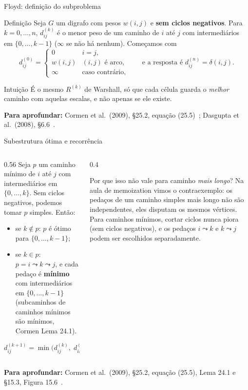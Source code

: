 \documentclass[aspectratio=169,xcolor=table]{beamer}
\newcommand{\fonte}[1]{%
  \vfill
  {\tiny\color{gray!55!black}\textbf{Para aprofundar:} #1\par}%
}
\begin{document}
\begin{frame}{Floyd: definição do subproblema}
  \begin{block}{Definição}
    \scriptsize Seja $G$ um digrafo com pesos $w(i,j)$ e \textbf{sem ciclos negativos}. Para
    $k = 0,\dots,n$, $d^{(k)}_{ij}$ é o menor peso de um caminho de $i$ até $j$ com
    intermediários em $\{0,\dots,k-1\}$ ($\infty$ se não há nenhum). Começamos com
    \[
      d^{(0)}_{ij} = \begin{cases} 0 & i = j,\\ w(i,j) & (i,j) \text{ é arco},\\
        \infty & \text{caso contrário},\end{cases}
      \qquad\text{e a resposta é } d^{(n)}_{ij} = \delta(i,j).
    \]
  \end{block}
  \begin{exampleblock}{Intuição}
    \scriptsize É o mesmo $R^{(k)}$ de Warshall, só que cada célula guarda o \emph{melhor}
    caminho com aquelas escalas, e não apenas se ele existe.
  \end{exampleblock}
  \fonte{Cormen et al.\ (2009), \S 25.2, equação (25.5)~\cite{cormen2009introduction};
    Dasgupta et al.\ (2008), \S 6.6~\cite{dasgupta2008algorithms}.}
\end{frame}

\begin{frame}{Subestrutura ótima e recorrência}
  \begin{columns}[c]
    \begin{column}{0.56\textwidth}
      \scriptsize Seja $p$ um caminho mínimo de $i$ até $j$ com intermediários em
      $\{0,\dots,k\}$. Sem ciclos negativos, podemos tomar $p$ simples. Então:
      \begin{itemize}\scriptsize
        \item se $k \notin p$: $p$ é ótimo para $\{0,\dots,k-1\}$;
        \item se $k \in p$: $p = i \leadsto k \leadsto j$, e cada pedaço é \textbf{mínimo}
              com intermediários em $\{0,\dots,k-1\}$ (subcaminhos de caminhos mínimos são
              mínimos, Cormen Lema 24.1).
      \end{itemize}
      \[
        d^{(k+1)}_{ij} = \min\bigl(d^{(k)}_{ij},\; d^{(k)}_{ik} + d^{(k)}_{kj}\bigr)
      \]
    \end{column}
    \begin{column}{0.4\textwidth}
      \begin{alertblock}{Por que isso não vale para caminho \emph{mais longo}?}
        \scriptsize Na aula de memoization vimos o contraexemplo: os pedaços de um caminho
        simples mais longo não são independentes, eles disputam os mesmos vértices. Para
        caminhos mínimos, cortar ciclos nunca piora (sem ciclos negativos), e os pedaços
        $i \leadsto k$ e $k \leadsto j$ podem ser escolhidos separadamente.
      \end{alertblock}
    \end{column}
  \end{columns}
  \fonte{Cormen et al.\ (2009), \S 25.2, equação (25.5), Lema 24.1 e \S 15.3, Figura
    15.6~\cite{cormen2009introduction}.}
\end{frame}
\end{document}
